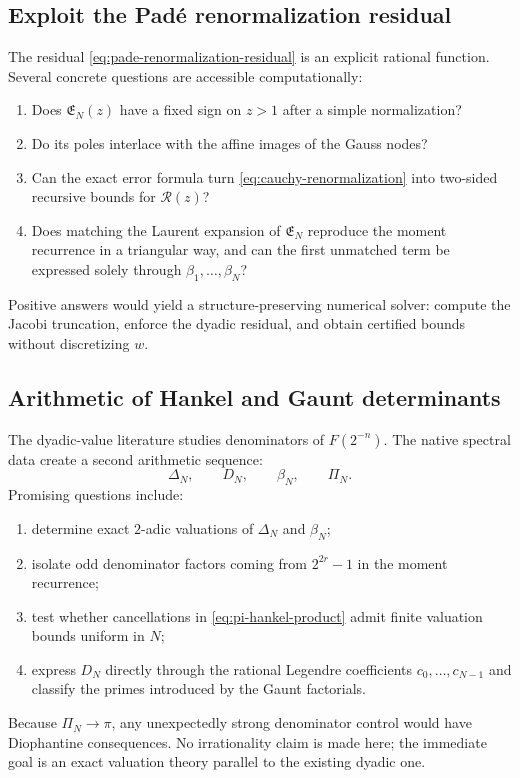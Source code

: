 \documentclass[11pt,oneside]{article}
\theoremstyle{definition}
\theoremstyle{remark}
\numberwithin{equation}{section}
\begin{document}
\subsection{Exploit the Pad\'e renormalization residual}
The residual \cref{eq:pade-renormalization-residual} is an explicit rational
function.  Several concrete questions are accessible computationally:
\begin{enumerate}
\item Does $\mathfrak E_N(z)$ have a fixed sign on $z>1$ after a simple
      normalization?
\item Do its poles interlace with the affine images of the Gauss nodes?
\item Can the exact error formula turn \cref{eq:cauchy-renormalization} into
      two-sided recursive bounds for $\mathcal R(z)$?
\item Does matching the Laurent expansion of $\mathfrak E_N$ reproduce the
      moment recurrence in a triangular way, and can the first unmatched term
      be expressed solely through $\beta_1,\ldots,\beta_N$?
\end{enumerate}
Positive answers would yield a structure-preserving numerical solver: compute
the Jacobi truncation, enforce the dyadic residual, and obtain certified bounds
without discretizing $w$.

\subsection{Arithmetic of Hankel and Gaunt determinants}
The dyadic-value literature studies denominators of $F(2^{-n})$.  The native
spectral data create a second arithmetic sequence:
\begin{equation}
 \Delta_N,\qquad D_N,\qquad \beta_N,
 \qquad \Pi_N.
 \label{eq:new-arithmetic-sequences}
\end{equation}
Promising questions include:
\begin{enumerate}
\item determine exact $2$-adic valuations of $\Delta_N$ and $\beta_N$;
\item isolate odd denominator factors coming from $2^{2r}-1$ in the moment
      recurrence;
\item test whether cancellations in
      \cref{eq:pi-hankel-product} admit finite valuation bounds uniform in
      $N$;
\item express $D_N$ directly through the rational Legendre coefficients
      $c_0,\ldots,c_{N-1}$ and classify the primes introduced by the Gaunt
      factorials.
\end{enumerate}
Because $\Pi_N\to\pi$, any unexpectedly strong denominator control would have
Diophantine consequences.  No irrationality claim is made here; the immediate
goal is an exact valuation theory parallel to the existing dyadic one.
\end{document}
